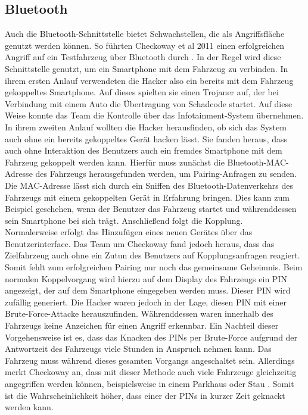 \subsection{Bluetooth}
Auch die Bluetooth-Schnittstelle bietet Schwachstellen, die als Angriffsfläche genutzt werden können. So führten Checkoway et al 2011 einen erfolgreichen Angriff auf ein Testfahrzeug über Bluetooth durch \cite[9]{Checkoway.2011}. In der Regel wird diese Schnittstelle genutzt, um ein Smartphone mit dem Fahrzeug zu verbinden. In ihrem ersten Anlauf verwendeten die Hacker also ein bereits mit dem Fahrzeug gekoppeltes Smartphone. Auf dieses spielten sie einen Trojaner auf, der bei Verbindung mit einem Auto die Übertragung von Schadcode startet. Auf diese Weise konnte das Team die Kontrolle über das Infotainment-System übernehmen. \\
In ihrem zweiten Anlauf wollten die Hacker herausfinden, ob sich das System auch ohne ein bereits gekoppeltes Gerät hacken lässt. Sie fanden heraus, dass auch ohne Interaktion des Benutzers auch ein fremdes Smartphone mit dem Fahrzeug gekoppelt werden kann. Hierfür muss zunächst die Bluetooth-MAC-Adresse des Fahrzeugs herausgefunden werden, um Pairing-Anfragen zu senden. Die MAC-Adresse lässt sich durch ein Sniffen des Bluetooth-Datenverkehrs des Fahrzeugs mit einem gekoppelten Gerät in Erfahrung bringen. Dies kann zum Beispiel geschehen, wenn der Benutzer das Fahrzeug startet und währenddessen sein Smartphone bei sich trägt. Anschließend folgt die Kopplung. \\
Normalerweise erfolgt das Hinzufügen eines neuen Gerätes über das Benutzerinterface. Das Team um Checkoway fand jedoch heraus, dass das Zielfahrzeug auch ohne ein Zutun des Benutzers auf Kopplungsanfragen reagiert. Somit fehlt zum erfolgreichen Pairing nur noch das gemeinsame Geheimnis. Beim normalen Koppelvorgang wird hierzu auf dem Display des Fahrzeugs ein PIN angezeigt, der auf dem Smartphone eingegeben werden muss. Dieser PIN wird zufällig generiert. Die Hacker waren jedoch in der Lage, diesen PIN mit einer Brute-Force-Attacke herauszufinden. Währenddessen waren innerhalb des Fahrzeugs keine Anzeichen für einen Angriff erkennbar. Ein Nachteil dieser Vorgehensweise ist es, dass das Knacken des PINs per Brute-Force aufgrund der Antwortzeit des Fahrzeugs viele Stunden in Anspruch nehmen kann. Das Fahrzeug muss während dieses gesamten Vorgangs angeschaltet sein. Allerdings merkt Checkoway an, dass mit dieser Methode auch viele Fahrzeuge gleichzeitig angegriffen werden können, beispielsweise in einem Parkhaus oder Stau \cite[9]{Checkoway.2011}. Somit ist die Wahrscheinlichkeit höher, dass einer der PINs in kurzer Zeit geknackt werden kann.
